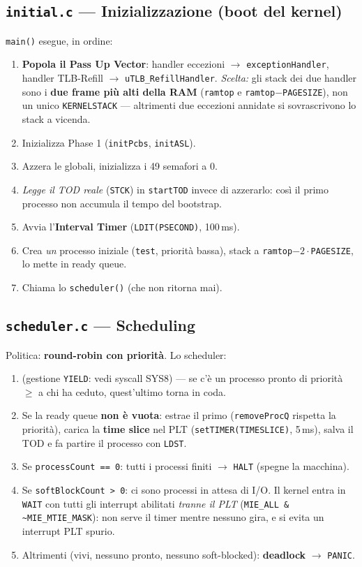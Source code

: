 \documentclass[11pt,a4paper]{article}
\newcommand{\code}[1]{\texttt{#1}}
\begin{document}
\subsection{\code{initial.c} --- Inizializzazione (boot del kernel)}
\code{main()} esegue, in ordine:
\begin{enumerate}
\item \textbf{Popola il Pass Up Vector}: handler eccezioni $\to$
  \code{exceptionHandler}, handler TLB-Refill $\to$ \code{uTLB\_RefillHandler}.
  \emph{Scelta:} gli stack dei due handler sono i \textbf{due frame più alti
  della RAM} (\code{ramtop} e \code{ramtop$-$PAGESIZE}), non un unico
  \code{KERNELSTACK} --- altrimenti due eccezioni annidate si sovrascrivono lo
  stack a vicenda.
\item Inizializza Phase 1 (\code{initPcbs}, \code{initASL}).
\item Azzera le globali, inizializza i 49 semafori a 0.
\item \emph{Legge il TOD reale} (\code{STCK}) in \code{startTOD} invece di
  azzerarlo: così il primo processo non accumula il tempo del bootstrap.
\item Avvia l'\textbf{Interval Timer} (\code{LDIT(PSECOND)}, 100\,ms).
\item Crea \emph{un} processo iniziale (\code{test}, priorità bassa), stack a
  \code{ramtop$-2\cdot$PAGESIZE}, lo mette in ready queue.
\item Chiama lo \code{scheduler()} (che non ritorna mai).
\end{enumerate}

\subsection{\code{scheduler.c} --- Scheduling}
Politica: \textbf{round-robin con priorità}. Lo scheduler:
\begin{enumerate}
\item (gestione \code{YIELD}: vedi syscall SYS8) --- se c'è un processo pronto
  di priorità $\ge$ a chi ha ceduto, quest'ultimo torna in coda.
\item Se la ready queue \textbf{non è vuota}: estrae il primo (\code{removeProcQ}
  rispetta la priorità), carica la \textbf{time slice} nel PLT
  (\code{setTIMER(TIMESLICE)}, 5\,ms), salva il TOD e fa partire il processo
  con \code{LDST}.
\item Se \code{processCount == 0}: tutti i processi finiti $\to$ \code{HALT}
  (spegne la macchina).
\item Se \code{softBlockCount > 0}: ci sono processi in attesa di I/O. Il kernel
  entra in \code{WAIT} con tutti gli interrupt abilitati \emph{tranne il PLT}
  (\code{MIE\_ALL \& \textasciitilde MIE\_MTIE\_MASK}): non serve il timer
  mentre nessuno gira, e si evita un interrupt PLT spurio.
\item Altrimenti (vivi, nessuno pronto, nessuno soft-blocked): \textbf{deadlock}
  $\to$ \code{PANIC}.
\end{enumerate}
\end{document}
